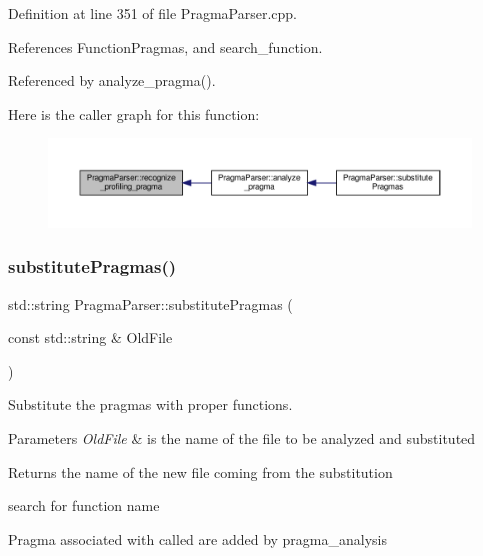 Definition at line 351 of file Pragma\+Parser.\+cpp.



References Function\+Pragmas, and search\+\_\+function.



Referenced by analyze\+\_\+pragma().

Here is the caller graph for this function\+:
\nopagebreak
\begin{figure}[H]
\begin{center}
\leavevmode
\includegraphics[width=350pt]{d6/d6c/classPragmaParser_aef9121fb371f00bf01e8e2be3f2c6b55_icgraph}
\end{center}
\end{figure}
\mbox{\label{classPragmaParser_a349706150aebec2e28658e6a880da5e0}} 
\subsubsection{\texorpdfstring{substitute\+Pragmas()}{substitutePragmas()}}
{\footnotesize\ttfamily std\+::string Pragma\+Parser\+::substitute\+Pragmas (\begin{DoxyParamCaption}\item[{const std\+::string \&}]{Old\+File }\end{DoxyParamCaption})}



Substitute the pragmas with proper functions. 


\begin{DoxyParams}{Parameters}
{\em Old\+File} & is the name of the file to be analyzed and substituted \\
\hline
\end{DoxyParams}
\begin{DoxyReturn}{Returns}
the name of the new file coming from the substitution 
\end{DoxyReturn}
search for function name

Pragma associated with called are added by pragma\+\_\+analysis

